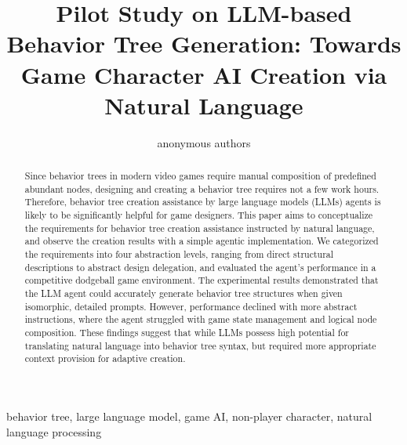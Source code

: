 \documentclass[conference]{IEEEtran}
\begin{document}
\title{Pilot Study on LLM-based Behavior Tree Generation:
Towards Game Character AI Creation via Natural Language}

\author{
anonymous authors
}

\maketitle

\begin{abstract}
Since behavior trees in modern video games require manual composition of predefined abundant nodes, designing and creating a behavior tree requires not a few work hours. Therefore, behavior tree creation assistance by large language models (LLMs) agents is likely to be significantly helpful for game designers. This paper aims to conceptualize the requirements for behavior tree creation assistance instructed by natural language, and observe the creation results with a simple agentic implementation. We categorized the requirements into four abstraction levels, ranging from direct structural descriptions to abstract design delegation, and evaluated the agent's performance in a competitive dodgeball game environment. The experimental results demonstrated that the LLM agent could accurately generate behavior tree structures when given isomorphic, detailed prompts. However, performance declined with more abstract instructions, where the agent struggled with game state management and logical node composition. These findings suggest that while LLMs possess high potential for translating natural language into behavior tree syntax, but required more appropriate context provision for adaptive creation.
\end{abstract}

\begin{IEEEkeywords}
behavior tree, large language model, game AI, non-player character, natural language processing
\end{IEEEkeywords}
\end{document}
